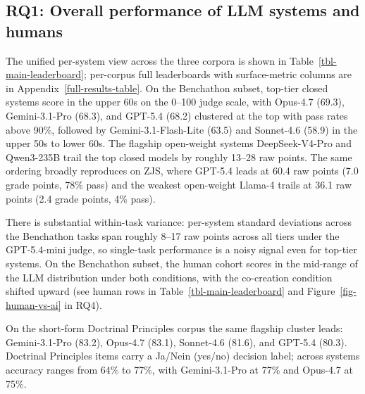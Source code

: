 \documentclass[11pt]{article}
\begin{document}
\subsection{RQ1: Overall performance of LLM systems and
humans}\label{rq1-overall-performance-of-llm-systems-and-humans}

The unified per-system view across the three corpora is shown in
Table~\ref{tbl-main-leaderboard}; per-corpus full leaderboards with
surface-metric columns are in Appendix~\ref{full-results-table}. On the
Benchathon subset, top-tier closed systems score in the upper 60s on the
0--100 judge scale, with Opus-4.7 (69.3), Gemini-3.1-Pro (68.3), and
GPT-5.4 (68.2) clustered at the top with pass rates above 90\%, followed
by Gemini-3.1-Flash-Lite (63.5) and Sonnet-4.6 (58.9) in the upper 50s
to lower 60s. The flagship open-weight systems DeepSeek-V4-Pro and
Qwen3-235B trail the top closed models by roughly 13--28 raw points. The
same ordering broadly reproduces on ZJS, where GPT-5.4 leads at 60.4 raw
points (7.0 grade points, 78\% pass) and the weakest open-weight Llama-4
trails at 36.1 raw points (2.4 grade points, 4\% pass).

There is substantial within-task variance: per-system standard
deviations across the Benchathon tasks span roughly 8--17 raw points
across all tiers under the GPT-5.4-mini judge, so single-task
performance is a noisy signal even for top-tier systems. On the
Benchathon subset, the human cohort scores in the mid-range of the LLM
distribution under both conditions, with the co-creation condition
shifted upward (see human rows in Table~\ref{tbl-main-leaderboard} and
Figure~\ref{fig-human-vs-ai} in RQ4).

On the short-form Doctrinal Principles corpus the same flagship cluster
leads: Gemini-3.1-Pro (83.2), Opus-4.7 (83.1), Sonnet-4.6 (81.6), and
GPT-5.4 (80.3). Doctrinal Principles items carry a Ja/Nein (yes/no)
decision label; across systems accuracy ranges from 64\% to 77\%, with
Gemini-3.1-Pro at 77\% and Opus-4.7 at 75\%.
\end{document}
